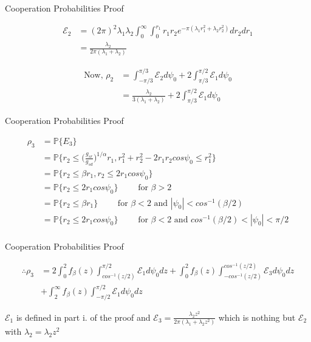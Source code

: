 \documentclass{beamer}
\begin{document}
\begin{frame}{Cooperation Probabilities} {Proof}

\begin{align*}
\mathcal{E}_2 &= (2\pi)^2\lambda_1 \lambda_2 \int_0^\infty \int_0^{r_1}r_1r_2e^{-\pi(\lambda_1 r_1^2 + \lambda_2 r_2^2)}dr_2 dr_1 \\
&= \frac{\lambda_2}{2\pi(\lambda_1+\lambda_2)}
\end{align*}
 
\begin{align*}
\text{Now, }\rho_2 &= \int_{-\pi/3}^{\pi/3} \mathcal{E}_2 d\psi_0 + 2\int_{\pi/3}^{\pi/2} \mathcal{E}_1d\psi_0 \\
&=  \frac{\lambda_2}{3(\lambda_1+\lambda_2)} + 2\int_{\pi/3}^{\pi/2} \mathcal{E}_1d\psi_0
\end{align*} 

\end{frame}

\begin{frame}{Cooperation Probabilities} {Proof}

\begin{align*}
\rho_3 &= \mathbb{P}\{E_3\} \\
&= \mathbb{P}\{r_2 \leq \bigg(\frac{g_{sr}}{g_{sd}} \bigg)^{1/\alpha}r_1, r_1^2+r_2^2-2r_1r_2cos\psi_0 \leq r_1^2\} \\
&= \mathbb{P}\{r_2 \leq \beta r_1, r_2 \leq 2 r_1 cos\psi_0 \} \\
&= \mathbb{P}\{r_2 \leq 2 r_1 cos\psi_0 \} \qquad \text{ for } \beta > 2 \\
&= \mathbb{P}\{r_2 \leq \beta r_1\} \qquad \text{ for } \beta < 2  \text{ and } |\psi_0| < cos^{-1}(\beta/2) \\
&= \mathbb{P}\{r_2 \leq 2 r_1 cos\psi_0 \} \qquad \text{ for } \beta < 2 \text{ and } cos^{-1}(\beta/2) < |\psi_0| <  \pi/2 \\
\end{align*}
\end{frame}


\begin{frame}{Cooperation Probabilities} {Proof}

\begin{align*}
\therefore \rho_3&= 2 \int_0^2 f_{\beta}(z)\int^{\pi/2}_{cos^{-1}(z/2)}\mathcal{E}_1 d\psi_0 dz  +\int_0^2 f_{\beta}(z)\int_{-cos^{-1}(z/2)}^{cos^{-1}(z/2)}\mathcal{E}_3 d\psi_0dz \\
&+ \int_2^{\infty} f_{\beta}(z)\int_{-\pi/2}^{\pi/2}\mathcal{E}_1 d\psi_0 dz \label{eq:corrected}
\end{align*}

$\mathcal{E}_1$ is defined in part i. of the proof and  $\mathcal{E}_3 = \frac{\lambda_2 z^2}{2\pi(\lambda_1+\lambda_2z^2)}$ which is nothing but $\mathcal{E}_2$ with $\lambda_2 = \lambda_2z^2$
\end{frame}
\end{document}
